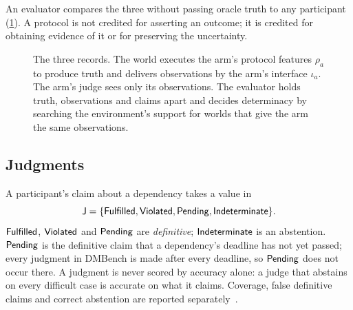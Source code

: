 An evaluator compares the three without passing oracle truth to any participant (\cref{fig:records}). A protocol is not credited for asserting an outcome; it is credited for obtaining evidence of it or for preserving the uncertainty.

\begin{figure}[t]
\centering
{}
\caption{The three records. The world executes the arm's protocol features $\rho_a$ to produce truth and delivers observations by the arm's interface $\iota_a$. The arm's judge sees only its observations. The evaluator holds truth, observations and claims apart and decides determinacy by searching the environment's support for worlds that give the arm the same observations.}
\label{fig:records}
\end{figure}

\subsection{Judgments}

A participant's claim about a dependency takes a value in
\[
\mathsf{J} = \{\mathsf{Fulfilled}, \mathsf{Violated}, \mathsf{Pending}, \mathsf{Indeterminate}\}.
\]
$\mathsf{Fulfilled}$, $\mathsf{Violated}$ and $\mathsf{Pending}$ are \emph{definitive}; $\mathsf{Indeterminate}$ is an abstention. $\mathsf{Pending}$ is the definitive claim that a dependency's deadline has not yet passed; every judgment in DMBench is made after every deadline, so $\mathsf{Pending}$ does not occur there. A judgment is never scored by accuracy alone: a judge that abstains on every difficult case is accurate on what it claims. Coverage, false definitive claims and correct abstention are reported separately~\cite{chow1970optimum,elyaniv2010foundations}.
